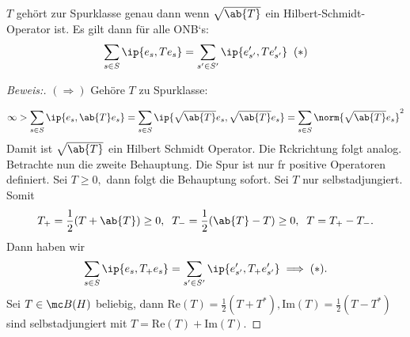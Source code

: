 \begin{theorem} $T $ gehört zur Spurklasse genau dann wenn $\sqrt{\ab{T}}$ ein Hilbert-Schmidt-Operator ist. Es gilt dann für alle ONB‘s: \[\sum_{s \in S} \ip{e_s, Te_s} = \sum_{s' \in S'} \ip{e'_{s'}, Te'_{s'}}\;\;(*)\]
	
	
	\begin{proof}[Beweis:] $(\Rightarrow)$ Gehöre $T$ zu Spurklasse:
		
	\[ \infty > \sum_{s \in S} \ip{e_s, \ab{T} e_s} = \sum_{s \in S} \ip{\sqrt{\ab{T}}e_s, \sqrt{\ab{T}}e_s} = \sum_{s \in S} \norm{\sqrt{\ab{T}}e_s}^2\] Damit ist $\sqrt{\ab{T}}$  ein Hilbert Schmidt Operator. Die R\us ckrichtung folgt analog. \\
	Betrachte nun die zweite Behauptung. Die Spur ist nur f\us r positive Operatoren definiert. Sei $T \geq 0,$ dann  folgt die Behauptung sofort. Sei $T$ nur selbstadjungiert. Somit \[T_+ = \frac{1}{2}(T + \ab{T}) \geq 0, \;\;T_- = \frac{1}{2}(\ab{T}- T) \geq 0,\;\; T = T_+ - T_-.\] Dann haben wir \[\sum_{s \in S} \ip{e_s, T_+e_s} = \sum_{s' \in S'} \ip{e'_{s'}, T_+ e'_{s'}} \implies (*).\] Sei $T \in \mc B(H)$ beliebig, dann $\text{Re}(T) = \frac{1}{2} (T + T^*), \text{Im}(T) = \frac{1}{2}(T-T^*)$ sind selbstadjungiert mit $T = \text{Re}(T) + \text{Im}(T).$ 
	\end{proof}
\end{theorem}

